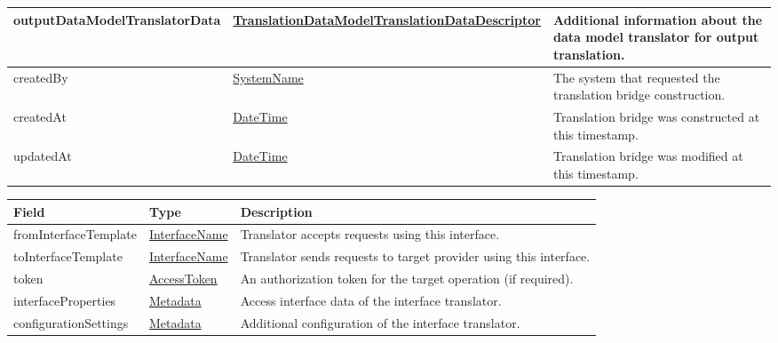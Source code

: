 \documentclass[a4paper]{arrowhead}
\newcommand{\pref}[1]{{\textcolor{ArrowheadGrey}{\hyperref[sec:model:primitives:#1]{#1}}}}
\begin{document}
\begin{table}[ht!]
\begin{tabularx}{\textwidth}{| p{5cm} | p{5.2cm} | X |}
outputDataModelTranslatorData & \hyperref[sec:model:TranslationDataModelTranslationDataDescriptor]{Translation\-Data\-Model\-Translation\-Data\-Descriptor} & Additional information about the data model translator for output translation. \\ \hline
createdBy & \pref{SystemName} & The system that requested the translation bridge construction. \\ \hline
createdAt & \pref{DateTime} & Translation bridge was constructed at this timestamp. \\ \hline
updatedAt & \pref{DateTime} & Translation bridge was modified at this timestamp. \\ \hline
\end{tabularx}
\end{table}

\clearpage


\begin{table}[ht!]
\begin{tabularx}{\textwidth}{| p{4.5cm} | p{3.5cm} | X |} \hline
\rowcolor{gray!33} Field & Type      & Description \\ \hline
fromInterfaceTemplate & \pref{InterfaceName} & Translator accepts requests using this interface. \\ \hline
toInterfaceTemplate & \pref{InterfaceName} & Translator sends requests to target provider using this interface. \\ \hline
token & \pref{AccessToken} & An authorization token for the target operation (if required). \\ \hline
interfaceProperties &\hyperref[sec:model:Metadata]{Metadata} & Access interface data of the interface translator. \\ \hline
configurationSettings &\hyperref[sec:model:Metadata]{Metadata} & Additional configuration of the interface translator. \\ \hline
\end{tabularx}
\end{table}

\end{document}
